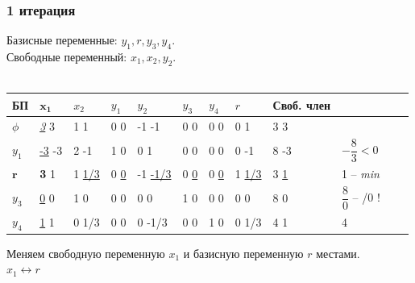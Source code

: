 \documentclass[14pt,a4paper,fleqn]{extarticle}
\begin{document}
\subsubsection*{1 итерация}
Базисные переменные: $y_1, r, y_3, y_4$.\\
Свободные переменный: $x_1, x_2, y_2$.\\\\
\begin{tabularx}{\textwidth}{|p{1cm}V{6}p{1cm}V{7}p{1cm}|p{1cm}|p{1cm}|p{1cm}|p{1cm}|p{1cm}|p{1cm}|c}
	\hline
	БП & $\boldsymbol{x_1}$ & $x_2$ & $y_1$ & $y_2$ & $y_3$ & $y_4$ & $r$ & Своб. член & \\
	\hline
	
	$\phi$ & \underline{\textit{3}} \scriptsize 3 & 1 \scriptsize 1 & 0 \scriptsize 0 & -1  \scriptsize -1 & 0 \scriptsize 0 & 0 \scriptsize 0 & 0 \scriptsize 1 & 3 \scriptsize 3 & \\
	
	\hline
	
	$y_1$ & \underline{-3} \scriptsize -3 & 2 \scriptsize -1 & 1 \scriptsize 0 & 0 \scriptsize 1 & 0 \scriptsize 0 & 0 \scriptsize 0 & 0 \scriptsize -1 & 8 \scriptsize -3 & $-\dfrac{8}{3} < 0$ \\
	
	\Xhline{7\arrayrulewidth}
	
	$\boldsymbol{r}$ & \textbf{3} \scriptsize 1 & 1 \underline{\scriptsize 1/3} & 0 \underline{\scriptsize 0} & -1 \underline{\tiny -1/3} & 0 \underline{\scriptsize 0} & 0  \underline{\scriptsize 0} & 1 \underline{\scriptsize 1/3} & 3 \underline{\scriptsize 1} & 1 -- \textit{min} \\
	
	\Xhline{7\arrayrulewidth}
	$y_3$ & \underline{0} \scriptsize 0 & 1 \scriptsize 0 & 0 \scriptsize 0 & 0 \scriptsize 0 & 1 \scriptsize 0 & 0 \scriptsize 0 & 0 \scriptsize 0 & 8 \scriptsize 0 & $\dfrac{8}{0}$ -- /0 ! \\
	\hline
	$y_4$ & \underline{1} \scriptsize 1 & 0 \scriptsize 1/3 & 0 \scriptsize 0 & 0 \scriptsize -1/3 & 0 \scriptsize 0 & 1 \scriptsize 0 & 0 \scriptsize 1/3 & 4 \scriptsize 1 & 4 \\
	\hline
\end{tabularx}
\newpage
Меняем свободную переменную $x_1$ и базисную переменную $r$ местами.\\
$x_1 \leftrightarrow r$
\end{document}
